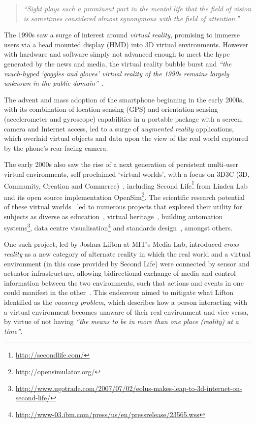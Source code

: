 \begin{quote}
	\textit{``Sight plays such a prominent part in the mental life that the field of vision is sometimes considered almost synonymous with the field of attention.''}~\cite{Lucas1951}
\end{quote}

The 1990s saw a surge of interest around \textit{virtual reality}, promising to immerse users via a head mounted display (HMD) into 3D virtual environments. However with hardware and software simply not advanced enough to meet the hype generated by the news and media, the virtual reality bubble burst and \textit{``the much-hyped `goggles and gloves' virtual reality of the 1990s remains largely unknown in the public domain''}~\cite{Green2014}.

The advent and mass adoption of the smartphone beginning in the early 2000s, with its combination of location sensing (GPS) and orientation sensing (accelerometer and gyroscope) capabilities in a portable package with a screen, camera and Internet access, led to a surge of \textit{augmented reality} applications, which overlaid virtual objects and data upon the view of the real world captured by the phone's rear-facing camera.

The early 2000s also saw the rise of a next generation of persistent multi-user virtual environments, self proclaimed `virtual worlds', with a focus on 3D3C (3D, Community, Creation and Commerce)~\cite{Sevan2008}, including Second Life\footnote{\url{http://secondlife.com/}} from Linden Lab and its open source implementation OpenSim\footnote{\url{http://opensimulator.org/}}. The scientific research potential of these virtual worlds~\cite{Bainbridge2007} led to numerous projects that explored their utility for subjects as diverse as education~\cite{Allison2012}, virtual heritage~\cite{Kennedy2013}, building automation systems\footnote{\url{http://www.ugotrade.com/2007/07/02/eolus-makes-leap-to-3d-internet-on-second-life/}}, data centre visualisation\footnote{\url{http://www-03.ibm.com/press/us/en/pressrelease/23565.wss}} and standards design~\cite{Gelissen2011a}, amongst others.

One such project, led by Joshua Lifton at MIT's Media Lab, introduced \textit{cross reality} as a new category of alternate reality in which the real world and a virtual environment (in this case provided by Second Life) were connected by sensor and actuator infrastructure, allowing bidirectional exchange of media and control information between the two environments, such that actions and events in one could manifest in the other~\cite{Lifton2007a}. This endeavour aimed to mitigate what Lifton identified as the \textit{vacancy problem}, which describes how a person interacting with a virtual environment becomes unaware of their real environment and vice versa, by virtue of not having \textit{``the means to be in more than one place (reality) at a time''}.

